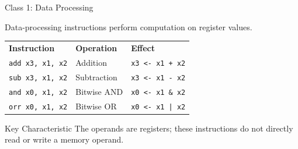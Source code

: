 \documentclass[aspectratio=169,11pt,t]{beamer}
\newcommand{\code}[1]{\texttt{#1}}
\begin{document}

\begin{frame}{Class 1: Data Processing}

Data-processing instructions
perform computation on register values.

\vspace{0.15cm}

\begin{center}

\small

\renewcommand{\arraystretch}{1.05}

\begin{tabular}{
  >{\raggedright\arraybackslash}m{3.5cm}
  >{\raggedright\arraybackslash}m{3.0cm}
  >{\raggedright\arraybackslash}m{4.2cm}
}

\rowcolor{navy}
{\color{white}\bfseries Instruction}
&
{\color{white}\bfseries Operation}
&
{\color{white}\bfseries Effect}
\\

\rowcolor{softgray}
\code{add x3, x1, x2}
&
Addition
&
\code{x3 <- x1 + x2}
\\

\rowcolor{white}
\code{sub x3, x1, x2}
&
Subtraction
&
\code{x3 <- x1 - x2}
\\

\rowcolor{softgray}
\code{and x0, x1, x2}
&
Bitwise AND
&
\code{x0 <- x1 \& x2}
\\

\rowcolor{white}
\code{orr x0, x1, x2}
&
Bitwise OR
&
\code{x0 <- x1 | x2}
\\

\end{tabular}

\end{center}

\vspace{0.15cm}

\begin{block}{Key Characteristic}
The operands are registers;
these instructions do not directly
read or write a memory operand.
\end{block}

\end{frame}



\end{document}
